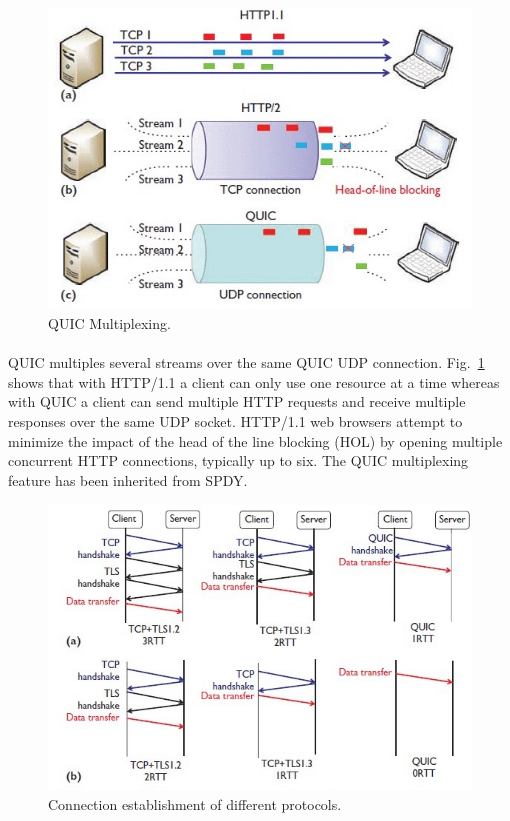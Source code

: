 \begin{figure}[h]
    \centering
    \includegraphics[width=.6\textwidth]{img/quic/transmission_compare}
    \caption{QUIC Multiplexing.}
    \label{fig:Quic1}
\end{figure}

\paragraph{} QUIC multiples several streams over the same QUIC UDP connection. Fig.~\ref{fig:Quic1} \cite{carlucci2015http} shows that with HTTP/1.1 a client can only use one resource at a time whereas with QUIC a client can send multiple HTTP requests and receive multiple responses over the same UDP socket. HTTP/1.1 web browsers attempt to minimize the impact of the head of the line blocking (HOL) by opening multiple concurrent HTTP connections, typically up to
six. The QUIC multiplexing feature has been inherited from
SPDY.

\begin{figure}[h]
    \centering
    \includegraphics[width=.6\textwidth]{img/quic/quicrrtcompare}
    \caption{Connection establishment of different protocols.}
    \label{fig:Quic2}
\end{figure}

